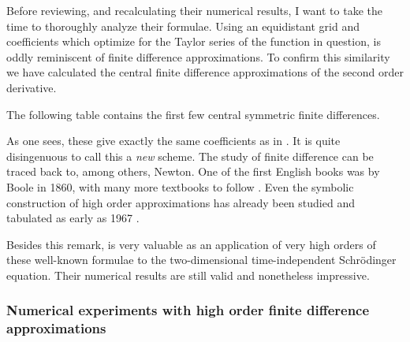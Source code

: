 Before reviewing, and recalculating their numerical results, I want to take the time to thoroughly analyze their formulae. Using an equidistant grid and coefficients which optimize for the Taylor series of the function in question, is oddly reminiscent of finite difference approximations. To confirm this similarity we have calculated the central finite difference approximations of the second order derivative.

The following table contains the first few central symmetric finite differences.
\begin{center}
    
\end{center}

As one sees, these give exactly the same coefficients as in \cite{wang_new_2009}. It is quite disingenuous to call this a \emph{new} scheme. The study of finite difference can be traced back to, among others, Newton. One of the first English books was by Boole \cite{boole_calculus_1860} in 1860, with many more textbooks to follow \cite{thomson_calculus_1933,jordan_calculus_1965}. Even the symbolic construction of high order approximations has already been studied and tabulated as early as 1967 \cite{ballester_construction_1967,keller_symbolic_1978,fornberg_generation_1988}.


Besides this remark, \cite{wang_new_2009} is very valuable as an application of very high orders of these well-known formulae to the two-dimensional time-independent Schrödinger equation. Their numerical results are still valid and nonetheless impressive.

\subsubsection{Numerical experiments with high order finite difference approximations}

